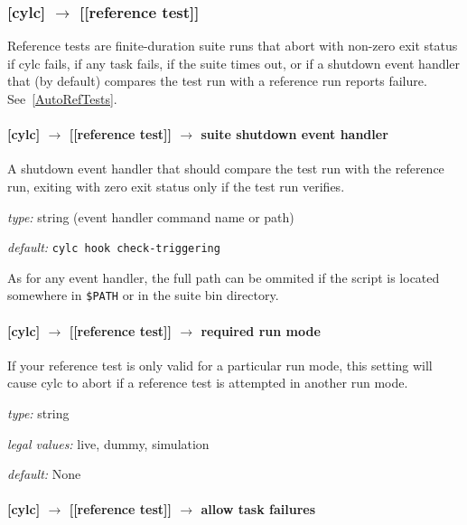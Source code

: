 \subsubsection[{[[}reference test{]]}]{[cylc] $\rightarrow$ [[reference test]] }
\label{ReferenceTestConfig}

Reference tests are finite-duration suite runs that abort with non-zero
exit status if cylc fails, if any task fails, if the suite times
out, or if a shutdown event handler that (by default) compares the test
run with a reference run reports failure. See~\ref{AutoRefTests}.

\paragraph[suite shutdown event handler]{[cylc] $\rightarrow$ [[reference test]] $\rightarrow$ suite shutdown event handler}

A shutdown event handler that should compare the test run with the
reference run, exiting with zero exit status only if the test run
verifies.

\begin{myitemize}
    \item {\em type:} string (event handler command name or path)
    \item {\em default:} \lstinline=cylc hook check-triggering=
\end{myitemize}
As for any event handler, the full path can be ommited if the script is
located somewhere in \lstinline=$PATH= or in the suite bin directory.

\paragraph[required run mode]{[cylc] $\rightarrow$ [[reference test]] $\rightarrow$ required run mode}

If your reference test is only valid for a particular run mode, this
setting will cause cylc to abort if a reference test is attempted
in another run mode.

\begin{myitemize}
    \item {\em type:} string
    \item {\em legal values:} live, dummy, simulation
    \item {\em default:} None
\end{myitemize}

\paragraph[allow task failures]{[cylc] $\rightarrow$ [[reference test]] $\rightarrow$ allow task failures}

